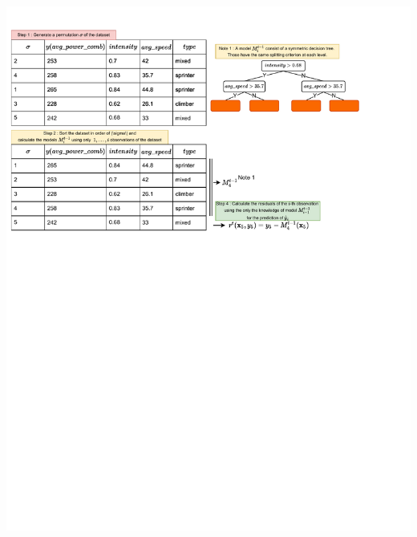 \documentclass[12pt,a4paper]{article}
\let\origfigure\figure
\let\endorigfigure\endfigure
\renewenvironment{figure}[1][2] {
    \expandafter\origfigure\expandafter[H]
} {
    \endorigfigure
}
\begin{document}
\begin{figure}
\centering
\includegraphics[height = 1.7\linewidth, width = 1.1\linewidth,trim=0in 4.7in 0in 0.0in,clip]{./includes/Ordered_Boosting.pdf}
\vspace{-3.6cm}\caption{The diagram shows how the orderd boosting algorithm in CatBoost works.}
\label{fig:ordered_boost}
\end{figure}
\end{document}
